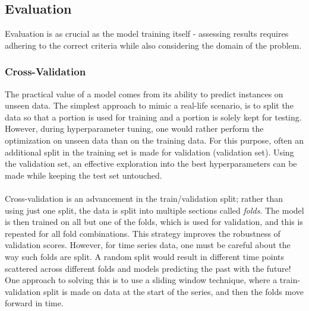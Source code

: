 \documentclass[a4paper]{report}
\begin{document}
\subsection{Evaluation}
Evaluation is as crucial as the model training itself - assessing results requires adhering to the correct criteria while also considering the domain of the problem.

\subsubsection{Cross-Validation}
The practical value of a model comes from its ability to predict instances on unseen data. The simplest approach to mimic a real-life scenario, is to split the data so that a portion is used for training and a portion is solely kept for testing. However, during hyperparameter tuning,
one would rather perform the optimization on unseen data than on the training data. For this purpose, often an additional split in the training set is made for validation (validation set). Using the validation set,
an effective exploration into the best hyperparameters can be made while keeping the test set untouched.\\\\Cross-validation is an advancement in the train/validation split; rather 
than using just one split, the data is split into multiple sections called \textit{folds}. The model is then trained on all but one of the folds, which is used for validation, and this is repeated
for all fold combinations. This strategy improves the robustness of validation scores. However, for time series data, one must be careful about the way such folds are split. A random 
split would result in different time points scattered across different folds and models predicting the past with the future! One approach to solving this is to use a sliding window technique,
where a train-validation split is made on data at the start of the series, and then the folds move forward in time.
\end{document}
